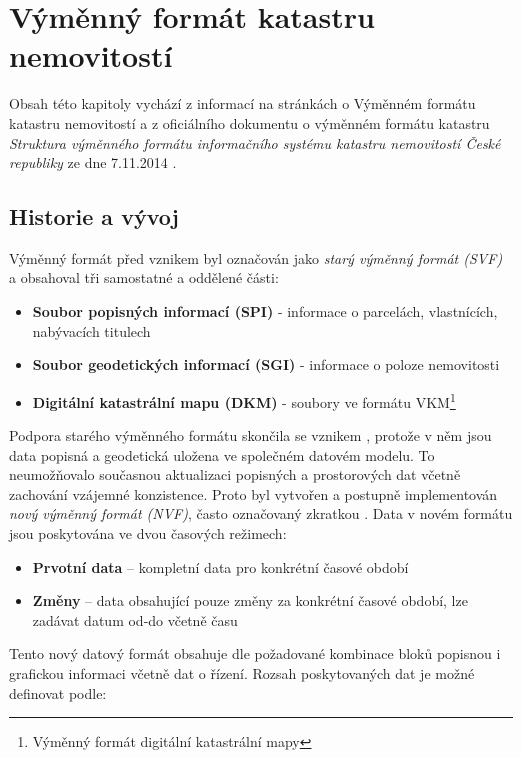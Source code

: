 \section{Výměnný formát katastru nemovitostí}
Obsah této kapitoly vychází z informací na stránkách  o
Výměnném formátu katastru nemovitostí a z oficiálního dokumentu o
výměnném formátu katastru \textit{Struktura výměnného formátu
  informačního systému katastru nemovitostí České republiky} ze dne
7.11.2014 \cite{struktura_ISKN}.
\subsection{Historie a vývoj}
Výměnný formát před vznikem  byl označován jako \textit{starý
  výměnný formát (SVF)} a obsahoval tři samostatné a oddělené části:
\begin{itemize}[leftmargin=50pt]
	\item \textbf{Soubor popisných informací (SPI)} - informace o parcelách, vlastnících, nabývacích titulech
	\item \textbf{Soubor geodetických informací (SGI)} - informace o poloze nemovitosti
	\item \textbf{Digitální katastrální mapu (DKM)} - soubory ve formátu VKM\footnote{Výměnný formát digitální katastrální mapy}
\end{itemize}
Podpora starého výměnného formátu skončila se vznikem ,
protože v něm jsou data popisná a geodetická uložena ve společném
datovém modelu. To neumožňovalo současnou aktualizaci popisných a prostorových dat včetně zachování vzájemné konzistence. Proto byl vytvořen a postupně implementován
\textit{nový výměnný formát (NVF)}, často označovaný zkratkou . Data v novém formátu jsou poskytována ve dvou
časových režimech:

\begin{itemize}[leftmargin=50pt]
\item \textbf{Prvotní data} -- kompletní data pro konkrétní časové období						
\item \textbf{Změny} -- data obsahující pouze změny za konkrétní časové období, lze zadávat datum od-do včetně času					 
\end{itemize}
Tento nový datový formát obsahuje dle požadované kombinace bloků
popisnou i grafickou informaci včetně dat o řízení. Rozsah
poskytovaných dat je možné definovat podle:

